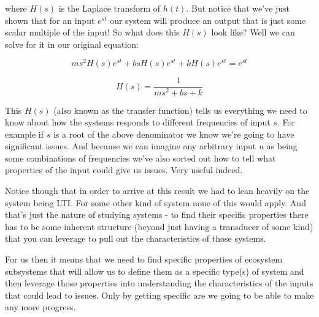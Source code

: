 \documentclass[11pt,a5paper]{article}
\begin{document}
 where $H(s)$ is the Laplace transform of $h(t)$. But notice that we've just shown that for an input $e^{st}$ our system will produce an output that is just some scalar multiple of the input! So what does this $H(s)$ look like? Well we can solve for it in our original equation:
 
 $$ms^2H(s)e^{st}+bsH(s)e^{st}+kH(s)e^{st}=e^{st}$$
 
 $$H(s) = \frac{1}{ms^2+bs+k}$$
 
This $H(s)$ (also known as the transfer function) tells us everything we need to know about how the systems responds to different frequencies of input $s$. For example if $s$ is a root of the above denominator we know we're going to have significant issues. And because we can imagine any arbitrary input $u$ as being some combinations of frequencies we've also sorted out how to tell what properties of the input could give us issues. Very useful indeed.\newline


Notice though that in order to arrive at this result we had to lean heavily on the system being LTI. For some other kind of system none of this would apply. And that's just the nature of studying systems - to find their specific properties there has to be some inherent structure (beyond just having a transducer of some kind) that you can leverage to pull out the characteristics of those systems. \newline

For us then it means that we need to find specific properties of ecosystem subsystems that will allow us to define them as a specific type(s) of system and then leverage those properties into understanding the characteristics of the inputs that could lead to issues. Only by getting specific are we going to be able to make any more progress.

 

\newpage



\end{document}
